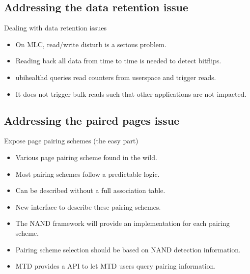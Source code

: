 \documentclass[aspectratio=169,obeyspaces,spaces,hyphens,dvipsnames]{beamer}
\begin{document}
\subsection{Addressing the data retention issue}

\begin{frame}{Dealing with data retention issues}
  \begin{itemize}
  \item On MLC, read/write disturb is a serious problem.
  \item Reading back all data from time to time is needed to detect bitflips.
  \item ubihealthd queries read counters from userspace and trigger reads.
  \item It does not trigger bulk reads such that other applications are not
	impacted.
  \end{itemize}
\end{frame}

\subsection{Addressing the paired pages issue}

\begin{frame}{Expose page pairing schemes (the easy part)}
  \begin{itemize}
  \item Various page pairing scheme found in the wild.
  \item Most pairing schemes follow a predictable logic.
  \item Can be described without a full association table.
  \item New interface to describe these pairing schemes.
  \item The NAND framework will provide an implementation for each pairing scheme.
  \item Pairing scheme selection should be based on NAND detection information.
  \item MTD provides a API to let MTD users query pairing information.
  \end{itemize}
\end{frame}
\end{document}

